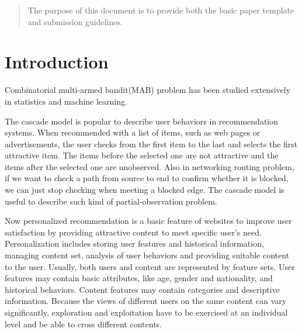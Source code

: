 \documentclass{article}
\begin{document}
 
	
	
\begin{abstract} 
The purpose of this document is to provide both the basic paper template and submission guidelines.
\end{abstract} 
	
\section{Introduction}

Combinatorial multi-armed bandit(MAB) problem has been studied extensively in statistics and machine learning. 

The cascade model is popular to describe user behaviors in recommendation systems. When recommended with a list of items, such as web pages or advertisements, the user checks from the first item to the last and selects the first attractive item. The items before the selected one are not attractive and the items after the selected one are unobserved. Also in networking routing problem, if we want to check a path from source to end to confirm whether it is blocked, we can just stop checking when meeting a blocked edge. The cascade model is useful to describe such kind of partial-observation problem. 

Now personalized recommendation is a basic feature of websites to improve user satisfaction by providing attractive content to meet specific user's need. Personalization includes storing user features and historical information, managing content set, analysis of user behaviors and providing suitable content to the user. Usually, both users and content are represented by feature sets. User features may contain basic attributes, like age, gender and nationality, and historical behaviors. Content features may contain categories and descriptive information. Because the views of different users on the same content can vary significantly, exploration and exploitation have to be exercised at an individual level and be able to cross different contents.
\end{document}
